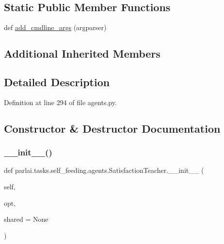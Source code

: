 \subsection*{Static Public Member Functions}
\begin{DoxyCompactItemize}
\item 
def \hyperlink{classparlai_1_1tasks_1_1self__feeding_1_1agents_1_1SatisfactionTeacher_a600955877888a602a2d83396248bde1a}{add\+\_\+cmdline\+\_\+args} (argparser)
\end{DoxyCompactItemize}
\subsection*{Additional Inherited Members}


\subsection{Detailed Description}


Definition at line 294 of file agents.\+py.



\subsection{Constructor \& Destructor Documentation}
\mbox{\label{classparlai_1_1tasks_1_1self__feeding_1_1agents_1_1SatisfactionTeacher_a10347310a1ea657acd9f44a7d35e7e1c}} 
\subsubsection{\texorpdfstring{\+\_\+\+\_\+init\+\_\+\+\_\+()}{\_\_init\_\_()}}
{\footnotesize\ttfamily def parlai.\+tasks.\+self\+\_\+feeding.\+agents.\+Satisfaction\+Teacher.\+\_\+\+\_\+init\+\_\+\+\_\+ (\begin{DoxyParamCaption}\item[{}]{self,  }\item[{}]{opt,  }\item[{}]{shared = {\ttfamily None} }\end{DoxyParamCaption})}




